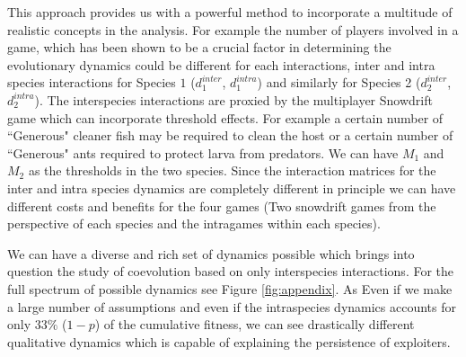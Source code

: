 \documentclass[12pt]{article}
\begin{document}
This approach provides us with a powerful method to incorporate a multitude of realistic concepts in the analysis.
For example the number of players involved in a game, which has been shown to be a crucial factor in determining the evolutionary dynamics could be different for each interactions, inter and intra species interactions for Species $1$ ($d^{inter}_1$, $d^{intra}_1$) and similarly for Species 2 ($d^{inter}_2$, $d^{intra}_2$). 
The interspecies interactions are proxied by the multiplayer Snowdrift game which can incorporate threshold effects.
For example a certain number of ``Generous" cleaner fish may be required to clean the host or a certain number of ``Generous" ants required to protect larva from predators.
We can have $M_1$ and $M_2$ as the thresholds in the two species.
Since the interaction matrices for the inter and intra species dynamics are completely different in principle we can have different costs and benefits for the four games (Two snowdrift games from the perspective of each species and the intragames within each species).

We can have a diverse and rich set of dynamics possible which brings into question the study of coevolution based on only interspecies interactions. 
For the full spectrum of possible dynamics see Figure \ref{fig:appendix}.
As 
Even if we make a large number of assumptions and even if the intraspecies dynamics accounts for only $33\%$ ($1-p$) of the cumulative fitness, we can see drastically different qualitative dynamics which is capable of explaining the persistence of exploiters.
\end{document}
